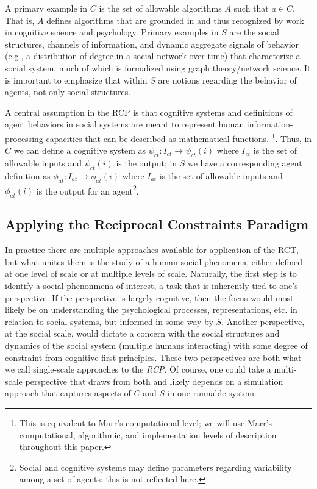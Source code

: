 \documentclass{article}
\begin{document}
A primary example in $C$ is the set of allowable algorithms $A$ such that $a \in C$. That is, $A$ defines algorithms that are grounded in and thus recognized by work in cognitive science and psychology.  Primary examples in $S$ are the social structures, channels of information, and dynamic aggregate signals of behavior (e.g., a distribution of degree in a social network over time) that characterize a social system, much of which is formalized using graph theory/network science.    It is important to emphasize that within $S$ are notions regarding the behavior of agents, not only social structures.

A central assumption in the RCP is that cognitive systems and definitions of agent behaviors in social systems are meant to represent human information-processing capacities that can be described as mathematical functions. \cite{van Rooij, 2008}\footnote{This is equivalent to Marr's computational level; we will use Marr's computational, algorithmic, and implementation levels of description\cite{Marr,1981} throughout this paper.}. Thus, in $C$ we can define a cognitive system as $\psi_{ct}: I_{ct} \rightarrow \psi_{ct}(i)$ where $I_{ct}$ is the set of allowable inputs and $\psi_{ct}(i)$ is the output; in $S$ we have a corresponding agent definition as $\phi_{at}: I_{at} \rightarrow \phi_{at}(i)$ where $I_{at}$ is the set of allowable inputs and $\phi_{at}(i)$ is the output for an agent\footnote{Social and cognitive systems may define parameters regarding variability among a set of agents; this is not reflected here.}. 

\subsection{Applying the Reciprocal Constraints Paradigm}   
In practice there are multiple approaches available for application of the RCT, but what unites them is the study of a human social phenomena, either defined at one level of scale or at multiple levels of scale.  Naturally, the first step is to identify a social phenonmena of interest, a task that is inherently tied to one's perspective.  If the perspective is largely cognitive, then the focus would most likely be on understanding the psychological processes, representations, etc. in relation to social systems, but informed in some way by $S$.   Another perspective, at the social scale, would dictate a concern with the social structures and dynamics of the social system (multiple humans interacting) with some degree of constraint from cognitive first principles.  These two perspectives are both what we call single-scale approaches to the \textit{RCP}. Of course, one could take a multi-scale perspective that draws from both and likely depends on a simulation approach that captures aspects of $C$ and $S$ in one runnable system.  
\end{document}
